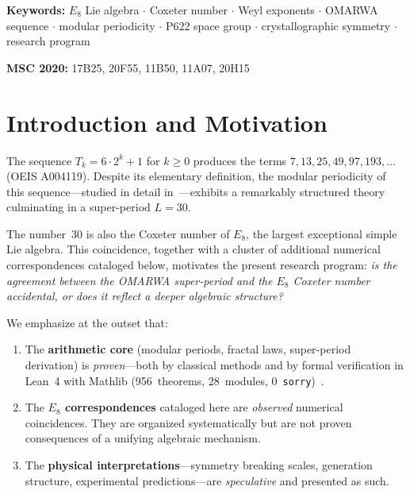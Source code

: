 \documentclass[11pt, a4paper]{article}
\theoremstyle{plain}
\theoremstyle{definition}
\theoremstyle{remark}
\begin{document}
\smallskip
\noindent\textbf{Keywords:} $E_8$ Lie algebra $\cdot$ Coxeter number
$\cdot$ Weyl exponents $\cdot$ OMARWA sequence $\cdot$ modular
periodicity $\cdot$ P622 space group $\cdot$ crystallographic symmetry
$\cdot$ research program

\smallskip
\noindent\textbf{MSC 2020:} 17B25, 20F55, 11B50, 11A07, 20H15

\vspace{0.5cm}

\section{Introduction and Motivation}
\label{sec:intro}

The sequence $T_k = 6 \cdot 2^k + 1$ for $k \geq 0$ produces the terms
$7, 13, 25, 49, 97, 193, \ldots$ (OEIS A004119). Despite its elementary
definition, the modular periodicity of this sequence---studied in
detail in~\cite{paket2}---exhibits a remarkably structured theory
culminating in a super-period $L = 30$.

The number~30 is also the Coxeter number of $E_8$, the largest
exceptional simple Lie algebra. This coincidence, together with
a cluster of additional numerical correspondences cataloged below,
motivates the present research program: \emph{is the agreement between
the OMARWA super-period and the $E_8$ Coxeter number accidental, or
does it reflect a deeper algebraic structure?}

We emphasize at the outset that:
\begin{enumerate}
  \item The \textbf{arithmetic core} (modular periods, fractal laws,
    super-period derivation) is \emph{proven}---both by classical methods
    and by formal verification in Lean~4 with Mathlib
    (956~theorems, 28~modules, 0~\texttt{sorry})~\cite{paket1}.

  \item The \textbf{$E_8$ correspondences} cataloged here are
    \emph{observed} numerical coincidences. They are organized
    systematically but are not proven consequences of a unifying
    algebraic mechanism.

  \item The \textbf{physical interpretations}---symmetry breaking scales,
    generation structure, experimental predictions---are \emph{speculative}
    and presented as such.
\end{enumerate}
\end{document}
